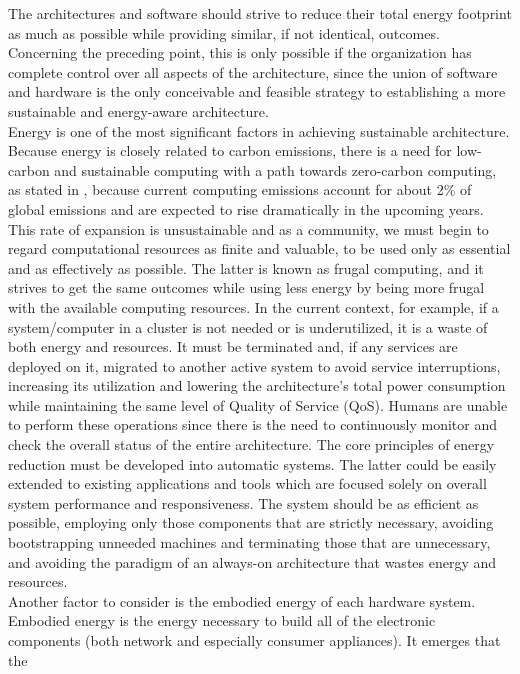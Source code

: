 The architectures and software should strive to reduce their total energy footprint
as much as possible while providing similar, if not identical, outcomes.
Concerning the preceding point, this is only possible if the organization has complete
control over all aspects of the architecture, since the union of software and
hardware is the only conceivable and feasible strategy to establishing a more
sustainable and energy-aware architecture. \\ %
Energy is one of the most significant factors in achieving sustainable
architecture. Because energy is closely related to carbon emissions, there is a
need for low-carbon and sustainable computing with a path towards zero-carbon
computing, as stated in \cite{frugal_computing}, because current computing
emissions account for about 2\% of global emissions and are expected to rise dramatically
in the upcoming years. This rate of expansion is unsustainable and as a
community, we must begin to regard computational resources as finite and valuable,
to be used only as essential and as effectively as possible. The latter is known
as frugal computing, and it strives to get the same outcomes while using less
energy by being more frugal with the available computing resources. In the current
context, for example, if a system/computer in a cluster is not needed or is underutilized,
it is a waste of both energy and resources. It must be terminated and, if any
services are deployed on it, migrated to another active system to avoid service interruptions,
increasing its utilization and lowering the architecture's total power
consumption while maintaining the same level of Quality of Service (QoS). Humans
are unable to perform these operations since there is the need to continuously monitor
and check the overall status of the entire architecture. The core principles of
energy reduction must be developed into automatic systems. The latter could be easily
extended to existing applications and tools which are focused solely on overall system
performance and responsiveness. The system should be as efficient as possible, employing
only those components that are strictly necessary, avoiding bootstrapping
unneeded machines and terminating those that are unnecessary, and avoiding the paradigm
of an always-on architecture that wastes energy and resources. \\ %
Another factor to consider is the embodied energy of each hardware system.
Embodied energy is the energy necessary to build all of the electronic
components (both network and especially consumer appliances). It emerges that the
